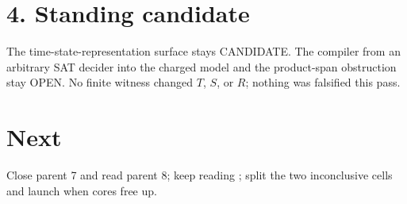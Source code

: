 \documentclass[11pt]{article}
\begin{document}
\section*{4. Standing candidate}
The time-state-representation surface stays CANDIDATE. The compiler from an arbitrary SAT decider into the charged model and the product-span obstruction stay OPEN. No finite witness changed $T$, $S$, or $R$; nothing was falsified this pass.

\section*{Next}
Close parent 7 and read parent 8; keep reading ; split the two inconclusive cells and launch  when cores free up.
\end{document}
